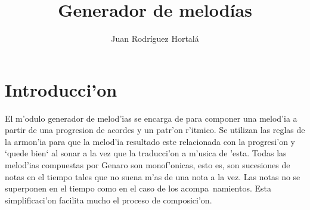 ﻿\documentclass[a4paper,12pt]{article}
\author{Juan Rodr\'iguez Hortal\'a}
\title{Generador de melod\'ias}
\begin{document}
\maketitle
\tableofcontents
\section{Introducci'on}
El m'odulo generador de melod'ias se encarga de para componer una melod'ia a partir de una progresion de acordes y un patr'on r'itmico. Se utilizan las reglas de la armon'ia para que la melod'ia resultado este relacionada con la progresi'on y `quede bien` al sonar a la vez que la traducci'on a m'usica de 'esta.
\newline
Todas las melod'ias compuestas por Genaro son monof'onicas, esto es, son sucesiones de notas en el tiempo tales que no suena m'as de una nota a la vez. Las notas no se superponen en el tiempo como en el caso de los acompa~namientos. Esta simplificaci'on facilita mucho el proceso de composici'on.
\end{document}
